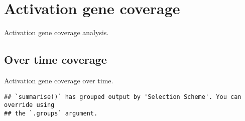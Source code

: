 \documentclass[]{book}
\newenvironment{Shaded}{\begin{snugshade}}{\end{snugshade}}
\newcommand{\CharTok}[1]{\textcolor[rgb]{0.31,0.60,0.02}{#1}}
\newcommand{\DataTypeTok}[1]{\textcolor[rgb]{0.13,0.29,0.53}{#1}}
\newcommand{\KeywordTok}[1]{\textcolor[rgb]{0.13,0.29,0.53}{\textbf{#1}}}
\newcommand{\NormalTok}[1]{#1}
\newcommand{\OperatorTok}[1]{\textcolor[rgb]{0.81,0.36,0.00}{\textbf{#1}}}
\newcommand{\StringTok}[1]{\textcolor[rgb]{0.31,0.60,0.02}{#1}}
\begin{document}
\hypertarget{activation-gene-coverage-1}{%
\section{Activation gene coverage}\label{activation-gene-coverage-1}}

Activation gene coverage analysis.

\hypertarget{over-time-coverage-1}{%
\subsection{Over time coverage}\label{over-time-coverage-1}}

Activation gene coverage over time.

\begin{Shaded}
\end{Shaded}

\begin{verbatim}
## `summarise()` has grouped output by 'Selection Scheme'. You can override using
## the `.groups` argument.
\end{verbatim}
\end{document}
